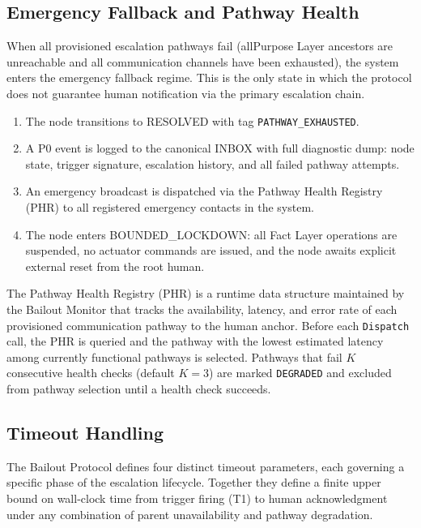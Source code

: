 \subsection{Emergency Fallback and Pathway Health}
\label{sec:bypass-emergency}

When all provisioned escalation pathways fail (allPurpose Layer ancestors are unreachable and all communication channels have been exhausted), the system enters the emergency fallback regime. This is the only state in which the protocol does not guarantee human notification via the primary escalation chain.

\begin{enumerate}
\item The node transitions to RESOLVED with tag \texttt{PATHWAY\_EXHAUSTED}.
\item A P0 event is logged to the canonical INBOX with full diagnostic dump: node state, trigger signature, escalation history, and all failed pathway attempts.
\item An emergency broadcast is dispatched via the Pathway Health Registry (PHR) to all registered emergency contacts in the system.
\item The node enters BOUNDED\_LOCKDOWN: all Fact Layer operations are suspended, no actuator commands are issued, and the node awaits explicit external reset from the root human.
\end{enumerate}

The Pathway Health Registry (PHR) is a runtime data structure maintained by the Bailout Monitor that tracks the availability, latency, and error rate of each provisioned communication pathway to the human anchor. Before each \texttt{Dispatch} call, the PHR is queried and the pathway with the lowest estimated latency among currently functional pathways is selected. Pathways that fail $K$ consecutive health checks (default $K = 3$) are marked \texttt{DEGRADED} and excluded from pathway selection until a health check succeeds.

\subsection{Timeout Handling}
\label{sec:bailout-timeouts}

The Bailout Protocol defines four distinct timeout parameters, each governing a specific phase of the escalation lifecycle. Together they define a finite upper bound on wall-clock time from trigger firing (T1) to human acknowledgment under any combination of parent unavailability and pathway degradation.

